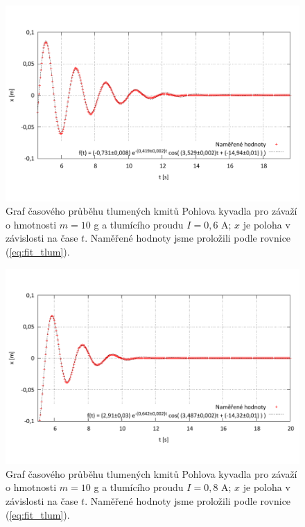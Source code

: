 \documentclass[english]{article}
\begin{document}
	\begin{figure}[h]
	\begin{center}
	\vspace*{-1cm}
		\includegraphics[width=\linewidth]{../gnuplot/10_pohl_dekr_06_10g.pdf}
	\vspace*{-2cm}
			\caption{Graf časového průběhu tlumených kmitů Pohlova kyvadla pro závaží o hmotnosti $m=10$ g a tlumícího proudu $I = 0,6$ A; $x$ je poloha v závislosti na čase $t$. Naměřené hodnoty jsme proložili podle rovnice (\ref{eq:fit_tlum}).}
			\label{fig:pohl_dekr_06}
	\end{center}
	\end{figure}

	\begin{figure}[h!]
	\begin{center}
	\vspace*{-1cm}
		\includegraphics[width=\linewidth]{../gnuplot/10_pohl_dekr_08_10g.pdf}
	\vspace*{-2cm}
			\caption{Graf časového průběhu tlumených kmitů Pohlova kyvadla pro závaží o hmotnosti $m=10$ g a tlumícího proudu $I = 0,8$ A; $x$ je poloha v závislosti na čase $t$. Naměřené hodnoty jsme proložili podle rovnice (\ref{eq:fit_tlum}).}
			\label{fig:pohl_dekr_08}
	\end{center}
	\end{figure}			
\end{document}
